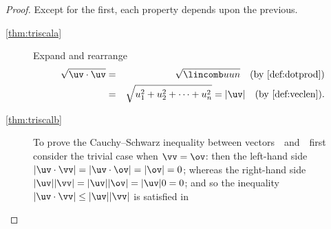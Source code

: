 \begin{proof} 
Except for the first, each property depends upon the previous.
\begin{description}
\item[\ref{thm:triscala}]
Expand and rearrange
\begin{eqnarray*}
\sqrt{\uv\cdot\uv}&=&\sqrt{\lincomb uun}\quad(\text{by \cref{def:dotprod}})
\\&=&\sqrt{u_1^2+u_2^2+\cdots+u_n^2}
=|\uv|\quad(\text{by \cref{def:veclen}}).
\end{eqnarray*}

\item[\ref{thm:triscalb}]  
To prove the Cauchy--Schwarz inequality between vectors~\uv\ and~\vv\ first consider the trivial case when \(\vv=\ov\): then the left-hand side \(|\uv\cdot\vv|=|\uv\cdot\ov|=|\ov|=0\); whereas the right-hand side \(|\uv||\vv|=|\uv||\ov|=|\uv|0=0\); and so the inequality \(|\uv\cdot\vv|\leq|\uv||\vv|\) is satisfied in 


\end{description}
\end{proof}

